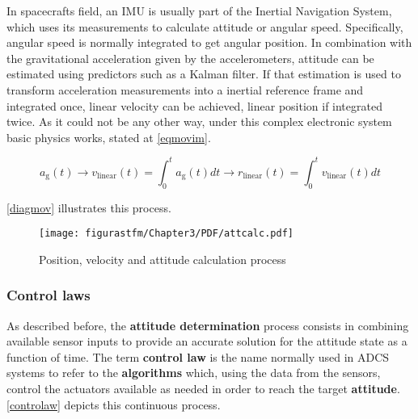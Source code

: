 In spacecrafts field, an \acrshort{IMU} is usually part of the Inertial Navigation System, which uses its measurements to calculate attitude or angular speed. Specifically, angular speed is normally integrated to get angular position. In combination with the gravitational acceleration given by the accelerometers, attitude can be estimated using predictors such as a Kalman filter. If that estimation is used to transform acceleration measurements into a inertial reference frame and integrated once, linear velocity can be achieved, linear position if integrated twice. As it could not be any other way, under this complex electronic system basic physics works, stated at \autoref{eqmovim}.



\begin{equation} \label{eqmovim}
a_\text{g}(t) \rightarrow v_\text{linear}(t) = \int_{0}^{t} a_\text{g}(t) dt \rightarrow r_\text{linear}(t) = \int_{0}^{t} v_\text{linear}(t) dt
\end{equation}

\autoref{diagmov} illustrates this process. 

\begin{figure}[H]
				\centering
				\texttt{[image: figurastfm/Chapter3/PDF/attcalc.pdf]}
				\caption{Position, velocity and attitude calculation process}
				\label{diagmov}
			\end{figure}

\newpage
\subsubsection{Control laws}

As described before, the \textbf{attitude determination} process consists in combining available sensor inputs to provide an accurate solution for the attitude state as a function of time. The term \textbf{control law} is the name normally used in \acrshort{ADCS} systems to refer to the \textbf{algorithms} which, using the data from the sensors, control the actuators available as needed in order to reach the target \textbf{attitude}. \autoref{controlaw} depicts this continuous process.

